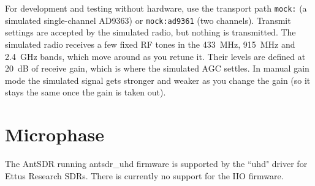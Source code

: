 For development and testing without hardware, use the transport path \texttt{mock:} (a simulated single-channel
AD9363) or \texttt{mock:ad9361} (two channels). Transmit settings are accepted by the simulated radio, but nothing
is transmitted. The simulated radio receives a few fixed RF tones in the 433~MHz,
915~MHz and 2.4~GHz bands, which move around as you retune it. Their levels are defined at 20~dB of receive gain,
which is where the simulated AGC settles. In manual gain mode the simulated signal gets stronger and weaker as you
change the gain (so it stays the same once the gain is taken out).

\section{Microphase}

The AntSDR running antsdr\_uhd firmware is supported by the ``uhd" driver for Ettus Research SDRs. There is currently no
support for the IIO firmware.
